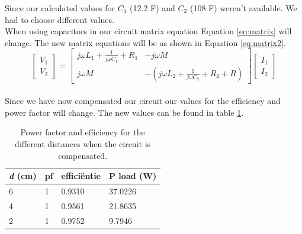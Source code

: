 \documentclass[final]{scrreprt} %
\begin{document}
Since our calculated values for $C_1$ (12.2 \nano F) and $C_2$ (108 \nano F) weren't available.
We had to choose different values. \\

When using capacitors in our circuit matrix equation Equation \ref{eq:matrix} will change. 
The new matrix equations will be as shown in Equation \ref{eq:matrix2}. \\

\begin{equation}
	\begin{bmatrix}
		V_1 \\
		V_2
	\end{bmatrix} =
	\begin{bmatrix}
		j\omega 
L_{1} + \frac{1}{j\omega C_{1}} + R_{1}& - j\omega M \\
		j\omega M& - (j\omega L_{2} + \frac{1}{j\omega C_{2}} + R_{2} + R)
	\end{bmatrix}
	\begin{bmatrix}
		I_1 \\
		I_2
	\end{bmatrix}
	\label{eq:matrix2}
\end{equation}\\




Since we have now compensated our circuit our values for the efficiency and power factor will change. 
The new values can be found in table \ref{table3}. \\

\begin{table}[h]
\begin{center}
\begin{tabular}{ l | l | l | l }
    
    \textbf{\textit{d} (cm)}            & \textbf{pf}              & \textbf{effici\"{e}ntie}  &  \textbf{P load (W)}\\	\hline
    6                           & 1                     & 0.9310                & 37.0226  \\
    4                           &1                  & 0.9561                     & 21.8635\\
    2                           & 1                   & 0.9752                    &  9.7946 \\
\end{tabular}
\caption{Power factor and efficiency for the different distances when the circuit is compensated.}
\label{table3}
\end{center}
\end{table}
\\
\end{document}
